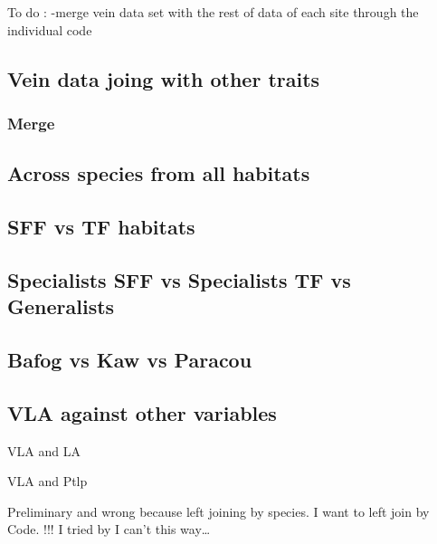 \documentclass[
]{book}
\begin{document}
To do :
-merge vein data set with the rest of data of each site through the individual code

\hypertarget{vein-data-joing-with-other-traits}{%
\subsection{Vein data joing with other traits}\label{vein-data-joing-with-other-traits}}

\hypertarget{merge}{%
\subsubsection{Merge}\label{merge}}

\hypertarget{across-species-from-all-habitats}{%
\subsection{Across species from all habitats}\label{across-species-from-all-habitats}}

\hypertarget{sff-vs-tf-habitats}{%
\subsection{SFF vs TF habitats}\label{sff-vs-tf-habitats}}

\hypertarget{specialists-sff-vs-specialists-tf-vs-generalists}{%
\subsection{Specialists SFF vs Specialists TF vs Generalists}\label{specialists-sff-vs-specialists-tf-vs-generalists}}

\hypertarget{bafog-vs-kaw-vs-paracou}{%
\subsection{Bafog vs Kaw vs Paracou}\label{bafog-vs-kaw-vs-paracou}}

\hypertarget{vla-against-other-variables}{%
\subsection{VLA against other variables}\label{vla-against-other-variables}}

VLA and LA

VLA and Ptlp

Preliminary and wrong because left joining by species. I want to left join by Code. !!!
I tried by I can't this way\ldots{}
\end{document}
